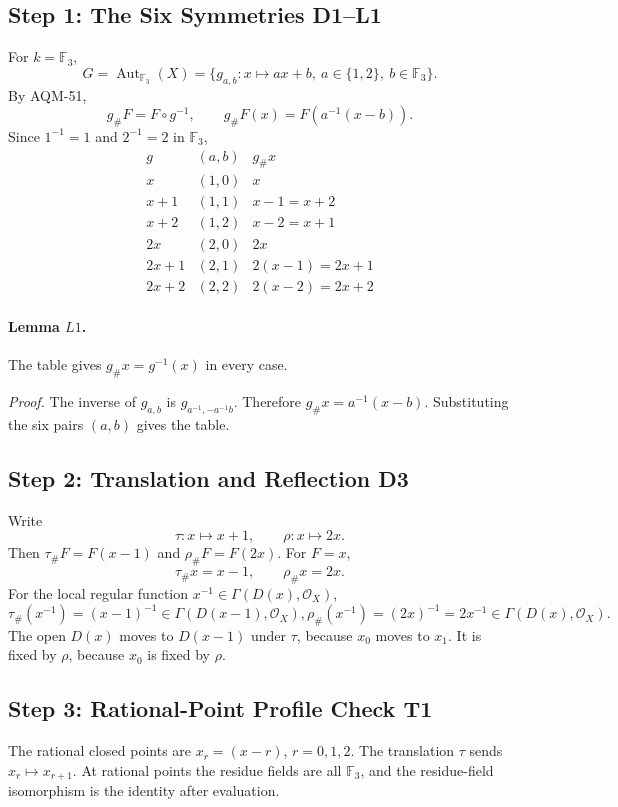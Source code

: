 \subsection{Step 1: The Six Symmetries D1--L1}
For \(k=\mathbb F_3\),
\[
  G=\operatorname{Aut}_{\mathbb F_3}(X)=
  \{g_{a,b}:x\mapsto ax+b,\ a\in\{1,2\},\ b\in\mathbb F_3\}.
\]
By AQM-51,
\[
  g_\#F=F\circ g^{-1},\qquad g_\#F(x)=F(a^{-1}(x-b)).
\]
Since \(1^{-1}=1\) and \(2^{-1}=2\) in \(\mathbb F_3\),
\[
\begin{array}{c|c|c}
g&(a,b)&g_\#x\\
\hline
x&(1,0)&x\\
x+1&(1,1)&x-1=x+2\\
x+2&(1,2)&x-2=x+1\\
2x&(2,0)&2x\\
2x+1&(2,1)&2(x-1)=2x+1\\
2x+2&(2,2)&2(x-2)=2x+2
\end{array}
\]

\paragraph{Lemma \(L1\).}
The table gives \(g_\#x=g^{-1}(x)\) in every case.

\emph{Proof.}
The inverse of \(g_{a,b}\) is \(g_{a^{-1},-a^{-1}b}\).  Therefore
\(g_\#x=a^{-1}(x-b)\).  Substituting the six pairs \((a,b)\) gives the table.

\subsection{Step 2: Translation and Reflection D3}
Write
\[
  \tau:x\mapsto x+1,\qquad \rho:x\mapsto2x.
\]
Then \(\tau_\#F=F(x-1)\) and \(\rho_\#F=F(2x)\).  For \(F=x\),
\[
  \tau_\#x=x-1,\qquad \rho_\#x=2x.
\]
For the local regular function \(x^{-1}\in\Gamma(D(x),\mathcal O_X)\),
\[
  \tau_\#(x^{-1})=(x-1)^{-1}\in\Gamma(D(x-1),\mathcal O_X),
  \rho_\#(x^{-1})=(2x)^{-1}=2x^{-1}\in\Gamma(D(x),\mathcal O_X).
\]
The open \(D(x)\) moves to \(D(x-1)\) under \(\tau\), because \(x_0\) moves to
\(x_1\).  It is fixed by \(\rho\), because \(x_0\) is fixed by \(\rho\).

\subsection{Step 3: Rational-Point Profile Check T1}
The rational closed points are \(x_r=(x-r)\), \(r=0,1,2\).  The translation
\(\tau\) sends \(x_r\mapsto x_{r+1}\).
At rational points the residue fields are all \(\mathbb F_3\), and the
residue-field isomorphism is the identity after evaluation.

